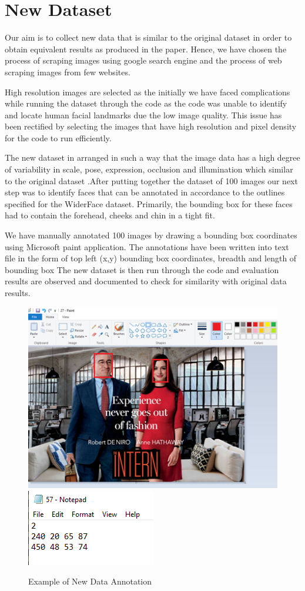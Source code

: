 \documentclass{article}
\begin{document}
\section{New Dataset}

Our aim is to collect new data that is similar to the original dataset in order to obtain equivalent results as produced in the paper. Hence, we have chosen the process of scraping images using google search engine and the process of web scraping images from few websites.

High resolution images are selected as the initially we have faced complications while running the dataset through the code as the code was unable to identify and locate human facial landmarks due the low image quality. This issue has been rectified by selecting the images that have high resolution and pixel density for the code to run efficiently. 

The new dataset in arranged in such a way that the image data has a high degree of variability in scale, pose, expression, occlusion and illumination which similar to the original dataset .After putting together the dataset of 100 images  our next step was to identify faces that can be annotated in accordance to the outlines specified for the WiderFace dataset. Primarily, the bounding box for these faces had to contain the forehead, cheeks and chin in a tight fit. 

We have manually annotated 100 images by drawing a bounding box coordinates using Microsoft paint application. The annotations have been written into text file in the form of top left (x,y) bounding box coordinates, breadth and length of bounding box The new dataset is then run through the code and evaluation results are observed and documented to check for similarity with original data results.
\begin{figure}[H]
	\includegraphics[width=0.5\linewidth]{Picture1.png}
	\includegraphics[width=0.5\linewidth]{Picture2.png}
	\caption{Example of New Data Annotation}
\end{figure}
\end{document}
